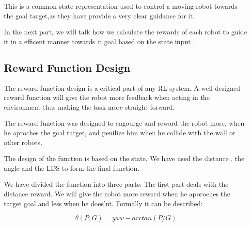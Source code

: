 \documentclass[12pt]{article}
\begin{document}
This is a common state representation used  to control a moving robot towards the goal target,as they have provide a very clear guidance for it. 
\cite{quiroga2022position} \cite{gong2022efficient}

In the next part, we will talk how we calculate the rewards of each robot to guide it in a efficent manner  towards it goal based on the state input  .
 



\pagebreak

\subsection{Reward Function Design}

The reward function design is a critical part of any RL system. A well designed reward function will give the  robot more feedback when acting in the environment thus making the task more straight forward.

The reward function was designed to engourge and reward the robot  more, when he  aproches the goal target, and penilize him when he collide with the wall or other robots.

The design of the function is based on the state. We have used the distance , the  angle and the LDS to form the final function.

We have   divided  the function into three parts:
The first part deals with the distance reward. We will give the robot more reward when he aporoches the target goal and less when he does'nt. Formally
it can be described:




\[ \theta(P,G)=yaw-arctan(P/G)  \] 





 
 






\pagebreak
\end{document}
